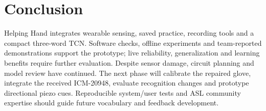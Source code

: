 \documentclass[11pt,letterpaper]{article}
\begin{document}
\par{}
\section{Conclusion}
Helping Hand integrates wearable sensing, saved practice, recording tools and
a compact three-word TCN. Software checks, offline experiments and team-reported
demonstrations support the prototype; live reliability, generalization and
learning benefits require further evaluation. Despite sensor damage, circuit
planning and model review have continued. The next phase will calibrate the
repaired glove, integrate the received ICM-20948, evaluate recognition changes
and prototype directional piezo cues. Reproducible system/user tests and ASL
community expertise should guide future vocabulary and feedback development.
\end{document}
